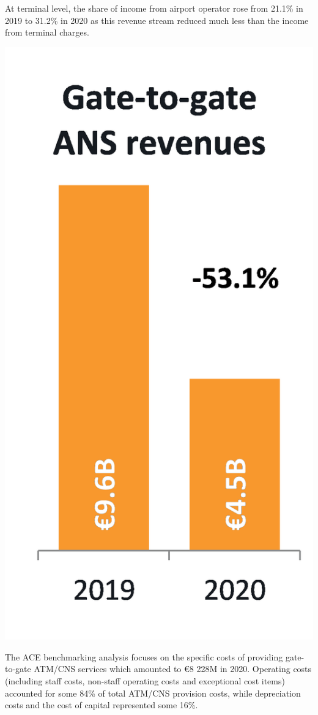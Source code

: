 \documentclass[
]{book}
\begin{document}
At terminal level, the share of income from airport operator rose from
21.1\% in 2019 to 31.2\% in 2020 as this revenue stream reduced much
less than the income from terminal charges.

\begin{center}\includegraphics[width=0.8\linewidth]{figures/Figure-2-2} \end{center}

The ACE benchmarking analysis focuses on the specific costs of providing
gate-to-gate ATM/CNS services which amounted to €8 228M in 2020.
Operating costs (including staff costs, non-staff operating costs and
exceptional cost items) accounted for some 84\% of total ATM/CNS
provision costs, while depreciation costs and the cost of capital
represented some 16\%.
\end{document}

